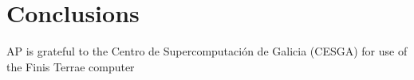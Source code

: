 \documentclass[aps,prl,superscriptaddress,twocolumn]{revtex4}
\begin{document}
\clearpage
\section{Conclusions}


%

\begin{acknowledgments}
AP is grateful to the Centro de
Supercomputación de Galicia (CESGA) for use of the Finis
Terrae computer
\end{acknowledgments}




\end{document}
